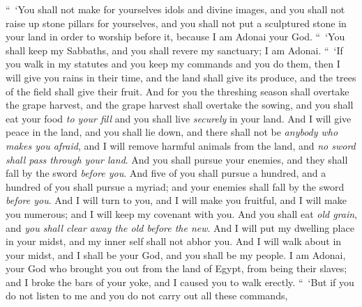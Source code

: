 \begin{biblechapter} %
 “ ‘You shall not make for yourselves idols and divine images, and you shall not raise up stone pillars for yourselves, and you shall not put a sculptured stone in your land in order to worship before it, because I am Adonai your God.
\verse “ ‘You shall keep my Sabbaths, and you shall revere my sanctuary; I am Adonai.
\verse “ ‘If you walk in my statutes and you keep my commands and you do them,
\verse then I will give you rains in their time, and the land shall give its produce, and the trees of the field shall give their fruit.
\verse And for you the threshing season shall overtake the grape harvest, and the grape harvest shall overtake the sowing, and you shall eat your food \textit{to your fill} and you shall live \textit{securely} in your land.
\verse And I will give peace in the land, and you shall lie down, and there shall not be \textit{anybody who makes you afraid}, and I will remove harmful animals from the land, and \textit{no sword shall pass through your land}.
\verse And you shall pursue your enemies, and they shall fall by the sword \textit{before you}.
\verse And five of you shall pursue a hundred, and a hundred of you shall pursue a myriad; and your enemies shall fall by the sword \textit{before you}.
\verse And I will turn to you, and I will make you fruitful, and I will make you numerous; and I will keep my covenant with you.
\verse And you shall eat \textit{old grain}, and \textit{you shall clear away the old before the new}.
\verse And I will put my dwelling place in your midst, and my inner self shall not abhor you.
\verse And I will walk about in your midst, and I shall be your God, and you shall be my people.
\verse I am Adonai, your God who brought you out from the land of Egypt, from being their slaves; and I broke the bars of your yoke, and I caused you to walk erectly.
 “ ‘But if you do not listen to me and you do not carry out all these commands,

\end{biblechapter}
